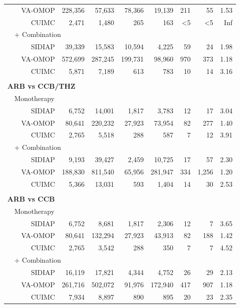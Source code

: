 \documentclass[11pt,]{article}
\begin{document}
\begin{longtable}{p{-2em}p{-2em}rrrrrrrr}
   &  & VA-OMOP & 228,356 & 57,633 & 78,366 & 19,139 & 211 & 55 & 1.53 \\ 
   &  & CUIMC & 2,471 & 1,480 & 265 & 163 & <5 & <5 & Inf \\ 
                           & \multicolumn{8}{l}{+ Combination} \\ &  & SIDIAP & 39,339 & 15,583 & 10,594 & 4,225 & 59 & 24 & 1.98 \\ 
   &  & VA-OMOP & 572,699 & 287,245 & 199,731 & 98,960 & 970 & 373 & 1.18 \\ 
   &  & CUIMC & 5,871 & 7,189 & 613 & 783 & 10 & 14 & 3.16 \\ 
   \rowcolor{white} \\ \multicolumn{9}{l}{\textbf{ARB vs CCB/THZ}} \\ & \multicolumn{9}{l}{Monotherapy}  \\ &  & SIDIAP & 6,752 & 14,001 & 1,817 & 3,783 & 12 & 17 & 3.04 \\ 
   &  & VA-OMOP & 80,641 & 220,232 & 27,923 & 73,954 & 82 & 277 & 1.40 \\ 
   &  & CUIMC & 2,765 & 5,518 & 288 & 587 & 7 & 12 & 3.91 \\ 
                           & \multicolumn{8}{l}{+ Combination} \\ &  & SIDIAP & 9,193 & 39,427 & 2,459 & 10,725 & 17 & 57 & 2.30 \\ 
   &  & VA-OMOP & 188,830 & 811,540 & 65,956 & 281,947 & 334 & 1,256 & 1.20 \\ 
   &  & CUIMC & 5,366 & 13,031 & 593 & 1,404 & 14 & 30 & 2.53 \\ 
   \rowcolor{white} \\ \multicolumn{9}{l}{\textbf{ARB vs CCB}} \\ & \multicolumn{9}{l}{Monotherapy}  \\ &  & SIDIAP & 6,752 & 8,681 & 1,817 & 2,306 & 12 & 7 & 3.65 \\ 
   &  & VA-OMOP & 80,641 & 132,294 & 27,923 & 43,913 & 82 & 188 & 1.42 \\ 
   &  & CUIMC & 2,765 & 3,542 & 288 & 350 & 7 & 7 & 4.52 \\ 
                           & \multicolumn{8}{l}{+ Combination} \\ &  & SIDIAP & 16,119 & 17,821 & 4,344 & 4,752 & 26 & 29 & 2.13 \\ 
   &  & VA-OMOP & 261,716 & 502,072 & 91,976 & 172,940 & 417 & 907 & 1.18 \\ 
   &  & CUIMC & 7,934 & 8,897 & 890 & 895 & 20 & 23 & 2.35 \\ 

\end{longtable}
\end{document}

